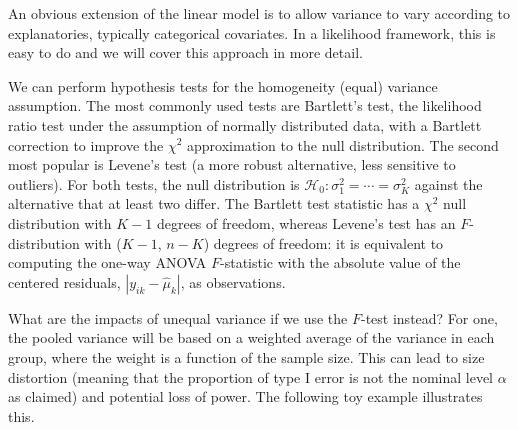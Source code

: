\documentclass[
  11pt,
  letterpaper,
]{scrbook}
\theoremstyle{definition}
\theoremstyle{definition}
\theoremstyle{plain}
\theoremstyle{plain}
\theoremstyle{remark}
\begin{document}
An obvious extension of the linear model is to allow variance to vary
according to explanatories, typically categorical covariates. In a
likelihood framework, this is easy to do and we will cover this approach
in more detail.

We can perform hypothesis tests for the homogeneity (equal) variance
assumption. The most commonly used tests are Bartlett's test, the
likelihood ratio test under the assumption of normally distributed data,
with a Bartlett correction to improve the \(\chi^2\) approximation to
the null distribution. The second most popular is Levene's test (a more
robust alternative, less sensitive to outliers). For both tests, the
null distribution is \(\mathscr{H}_0: \sigma^2_1 = \cdots = \sigma^2_K\)
against the alternative that at least two differ. The Bartlett test
statistic has a \(\chi^2\) null distribution with \(K-1\) degrees of
freedom, whereas Levene's test has an \(F\)-distribution with (\(K-1\),
\(n-K\)) degrees of freedom: it is equivalent to computing the one-way
ANOVA \(F\)-statistic with the absolute value of the centered residuals,
\(|y_{ik} - \widehat{\mu}_k|\), as observations.

What are the impacts of unequal variance if we use the \(F\)-test
instead? For one, the pooled variance will be based on a weighted
average of the variance in each group, where the weight is a function of
the sample size. This can lead to size distortion (meaning that the
proportion of type I error is not the nominal level \(\alpha\) as
claimed) and potential loss of power. The following toy example
illustrates this.
\end{document}
